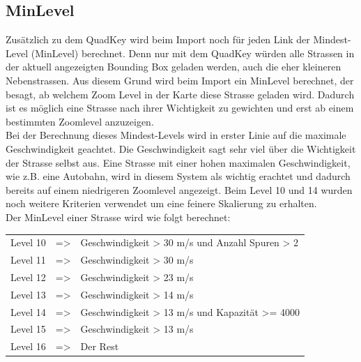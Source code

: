 \subsection{MinLevel}
Zusätzlich zu dem QuadKey wird beim Import noch für jeden Link der Mindest-Level (MinLevel) berechnet. Denn nur mit dem QuadKey würden alle Strassen in der aktuell angezeigten Bounding Box geladen werden, auch die eher kleineren Nebenstrassen. Aus diesem Grund wird beim Import ein MinLevel berechnet, der besagt, ab welchem Zoom Level in der Karte diese Strasse geladen wird. Dadurch ist es möglich eine Strasse nach ihrer Wichtigkeit zu gewichten und erst ab einem bestimmten Zoomlevel anzuzeigen. \\
Bei der Berechnung dieses Mindest-Levels wird in erster Linie auf die maximale  Geschwindigkeit geachtet. Die Geschwindigkeit sagt sehr viel über die Wichtigkeit der Strasse selbst aus. Eine Strasse mit einer hohen maximalen Geschwindigkeit, wie z.B. eine Autobahn, wird in diesem System als wichtig erachtet und dadurch bereits auf einem niedrigeren Zoomlevel angezeigt. Beim Level 10 und 14 wurden noch weitere Kriterien verwendet um eine feinere Skalierung zu erhalten.\\
Der MinLevel einer Strasse wird wie folgt berechnet:\\[0.3cm]
\begin{tabular}{l c l} 
Level 10 & => & Geschwindigkeit > 30 m/s und Anzahl Spuren > 2 \\ 
Level 11 & => & Geschwindigkeit > 30 m/s  \\ 
Level 12 & => & Geschwindigkeit > 23 m/s \\ 
Level 13 & => & Geschwindigkeit > 14 m/s \\ 
Level 14 & => & Geschwindigkeit > 13 m/s und Kapazität >= 4000  \\ 
Level 15 & => & Geschwindigkeit > 13 m/s \\ 
Level 16 & => & Der Rest \\ 
\end{tabular}
\newpage
